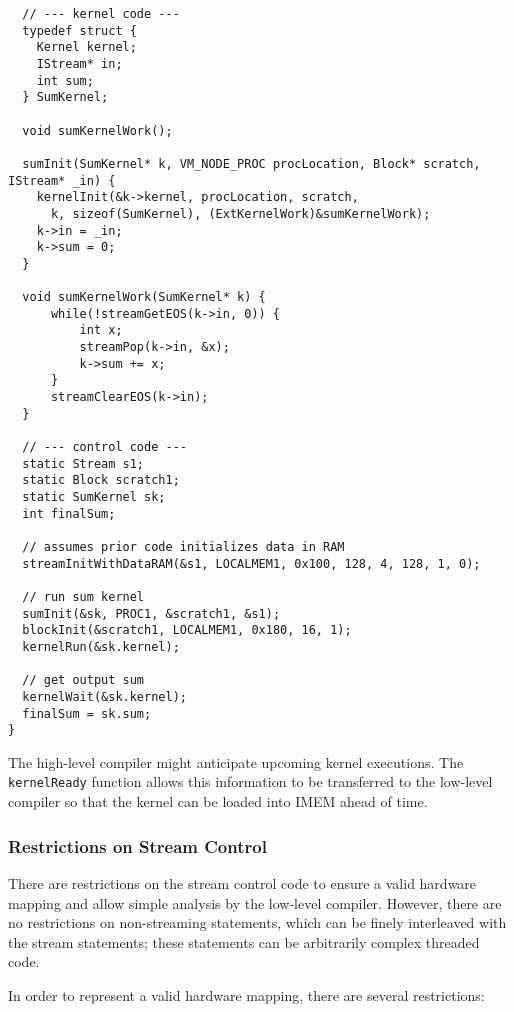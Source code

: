 {\small
\begin{verbatim}
  // --- kernel code ---
  typedef struct {
    Kernel kernel;
    IStream* in;
    int sum;
  } SumKernel;

  void sumKernelWork();
  
  sumInit(SumKernel* k, VM_NODE_PROC procLocation, Block* scratch, IStream* _in) {
    kernelInit(&k->kernel, procLocation, scratch,
      k, sizeof(SumKernel), (ExtKernelWork)&sumKernelWork); 
    k->in = _in;
    k->sum = 0;
  }

  void sumKernelWork(SumKernel* k) {
      while(!streamGetEOS(k->in, 0)) {
          int x;
          streamPop(k->in, &x);
          k->sum += x;
      }
      streamClearEOS(k->in);
  }

  // --- control code ---
  static Stream s1;
  static Block scratch1;
  static SumKernel sk;
  int finalSum;

  // assumes prior code initializes data in RAM
  streamInitWithDataRAM(&s1, LOCALMEM1, 0x100, 128, 4, 128, 1, 0);

  // run sum kernel
  sumInit(&sk, PROC1, &scratch1, &s1);
  blockInit(&scratch1, LOCALMEM1, 0x180, 16, 1);
  kernelRun(&sk.kernel);

  // get output sum
  kernelWait(&sk.kernel);
  finalSum = sk.sum;
}\end{verbatim}}


The high-level compiler might anticipate upcoming kernel executions. The {\tt kernelReady} function allows this information to be transferred to the low-level compiler so that the kernel can be loaded into IMEM ahead of time.

\subsubsection{Restrictions on Stream Control}

There are restrictions on the stream control code to ensure a valid hardware mapping and allow simple analysis by the low-level compiler. However, there are no restrictions on non-streaming statements, which can be finely interleaved with the stream statements; these statements can be arbitrarily complex threaded code.

In order to represent a valid hardware mapping, there are several restrictions:

